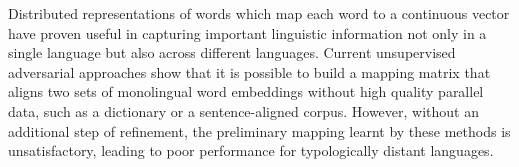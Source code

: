 Distributed representations of words which map each word to a continuous vector have proven useful in capturing important linguistic information not only in a single language but also across different languages. Current unsupervised adversarial approaches show that it is possible to build a mapping matrix that aligns two sets of monolingual word embeddings without high quality parallel data, such as a dictionary or a sentence-aligned corpus. However, without an additional step of refinement, the preliminary mapping learnt by these methods is unsatisfactory, leading to poor performance for typologically distant languages.